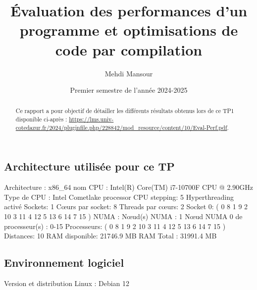 \documentclass{rapport}
\title{Évaluation des performances d’un programme et optimisations de code par compilation}
\author{Mehdi Mansour}
\date{Premier semestre de l'année 2024-2025}
\begin{document}
  \maketitle

  \begin{abstract}
    Ce rapport a pour objectif de détailler les différents résultats obtenus lors de ce TP1 disponible ci-après : \url{https://lms.univ-cotedazur.fr/2024/pluginfile.php/228842/mod_resource/content/10/Eval-Perf.pdf}.
     \end{abstract}
\subsection*{Architecture utilisée pour ce TP}
     \noindent
     Architecture : x86\_64
     \newline
      \noindent
     nom CPU :	Intel(R) Core(TM) i7-10700F CPU @ 2.90GHz
     \newline
     Type de CPU :	Intel Cometlake processor
     \newline
     CPU stepping:	5
     \newline
     Hyperthreading activé
     \newline
     Sockets:		1
     \newline
     Cœurs par socket:	8
     \newline
     Threads par cœurs:	2
     \newline
     Socket 0:		( 0 8 1 9 2 10 3 11 4 12 5 13 6 14 7 15 )
     \newline
     \newline
     NUMA :
     \newline \indent
         Nœud(s) NUMA : 1
          \newline \indent
         Nœud NUMA 0 de processeur(s) : 0-15
     \newline
     Processeurs:		( 0 8 1 9 2 10 3 11 4 12 5 13 6 14 7 15 )
     \newline
     Distances:		10
     \newline
     RAM disponible:		21746.9 MB
     \newline
     RAM Total :		31991.4 MB
 \subsection*{Environnement logiciel}
 Version et distribution Linux : Debian 12
\end{document}
